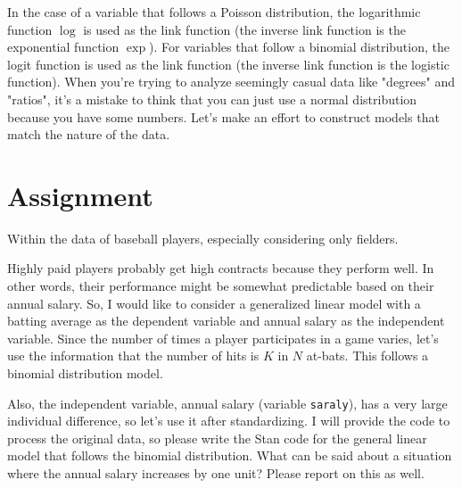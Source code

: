 \documentclass{ltjsbook}
\begin{document}
In the case of a variable that follows a Poisson distribution, the logarithmic function $\log$ is used as the link function (the inverse link function is the exponential function $\exp$). For variables that follow a binomial distribution, the logit function is used as the link function (the inverse link function is the logistic function).
When you're trying to analyze seemingly casual data like "degrees" and "ratios", it's a mistake to think that you can just use a normal distribution because you have some numbers. Let's make an effort to construct models that match the nature of the data.

\section{Assignment}
Within the data of baseball players, especially considering only fielders.

Highly paid players probably get high contracts because they perform well. In other words, their performance might be somewhat predictable based on their annual salary.
So, I would like to consider a generalized linear model with a batting average as the dependent variable and annual salary as the independent variable.
Since the number of times a player participates in a game varies, let's use the information that the number of hits is $K$ in $N$ at-bats. This follows a binomial distribution model.

Also, the independent variable, annual salary (variable \verb|saraly|), has a very large individual difference, so let's use it after standardizing.
I will provide the code to process the original data, so please write the Stan code for the general linear model that follows the binomial distribution.
What can be said about a situation where the annual salary increases by one unit? Please report on this as well.
\end{document}
